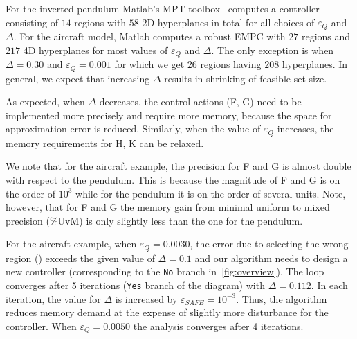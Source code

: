 
For the inverted pendulum Matlab's MPT toolbox~\cite{matlabMPT} computes a controller
consisting of $14$ regions with $58$ 2D hyperplanes in total for all choices of $\varepsilon_Q$ and $\Delta$. 
For the aircraft model, Matlab computes a robust EMPC with
$27$ regions and $217$ 4D hyperplanes for most values of $\varepsilon_Q$ and $\Delta$. 
The only exception is when $\Delta=0.30$
and $\varepsilon_Q=0.001$ for which we get $26$ regions having $208$ hyperplanes.
In general, we expect that increasing $\Delta$ results in shrinking of feasible
set size.

As expected, when $\Delta$ decreases, the control actions (F, G) need to be implemented
more precisely and require more memory, because the space for approximation error
is reduced. Similarly, when the value of $\varepsilon_Q$ increases, the memory
requirements for H, K can be relaxed.

We note that for the aircraft example,
the precision for F and G is almost double with respect to the pendulum. This is
because the magnitude of F and G is on the order of $10^{3}$ while for the
pendulum it is on the order of several units. Note, however, that for F and G the memory gain
from minimal uniform to mixed precision (\%UvM) is only slightly less than the one for the pendulum.


For the aircraft example, when $\varepsilon_Q=0.0030$, the error due to selecting the wrong region (\maxUij) 
exceeds the given value of $\Delta=0.1$ and our algorithm
needs to design a new controller (corresponding to the \texttt{No} branch in~\autoref{fig:overview}). 
The loop converges after 5 iterations (\texttt{Yes}
branch of the diagram) with $\Delta=0.112$. In each iteration, the value
for $\Delta$ is increased by $\varepsilon_{SAFE} = 10^{-3}$.
Thus, the algorithm reduces memory demand
at the expense of slightly more disturbance for the controller. When
$\varepsilon_Q=0.0050$ the analysis converges after 4 iterations.


